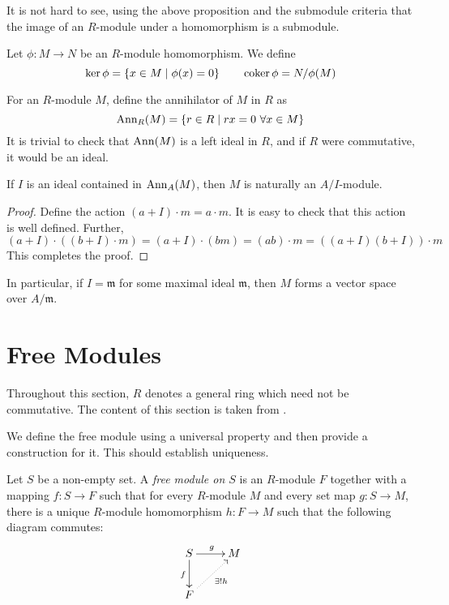 It is not hard to see, using the above proposition and the submodule criteria that the image of an $R$-module under a homomorphism is a submodule.


\begin{definition}
    Let $\phi:M\to N$ be an $R$-module homomorphism. We define 
    \begin{equation*}
        \ker\phi = \{x\in M\mid\phi(x) = 0\}\qquad\operatorname{coker}\phi = N/\phi(M)
    \end{equation*}
\end{definition}

For an $R$-module $M$, define the annihilator of $M$ in $R$ as 
\begin{equation*}
    \operatorname{Ann}_R(M) = \{r\in R\mid rx = 0~\forall x\in M\}
\end{equation*}
It is trivial to check that $\operatorname{Ann}(M)$ is a left ideal in $R$, and if $R$ were commutative, it would be an ideal.

\begin{proposition}
    If $I$ is an ideal contained in $\operatorname{Ann}_A(M)$, then $M$ is naturally an $A/I$-module.
\end{proposition}
\begin{proof}
    Define the action $(a + I)\cdot m = a\cdot m$. It is easy to check that this action is well defined. Further, 
    \begin{equation*}
        (a + I)\cdot((b + I)\cdot m) = (a + I)\cdot(bm) = (ab)\cdot m = ((a + I)(b + I))\cdot m
    \end{equation*}
    This completes the proof.
\end{proof}

In particular, if $I = \mathfrak m$ for some maximal ideal $\mathfrak m$, then $M$ forms a vector space over $A/\mathfrak m$.

\section{Free Modules}
Throughout this section, $R$ denotes a general ring which need not be commutative. The content of this section is taken from \cite{blyth}. 

We define the free module using a universal property and then provide a construction for it. This should establish uniqueness.

\begin{definition}
    Let $S$ be a non-empty set. A \textit{free module on $S$} is an $R$-module $F$ together with a mapping $f: S\to F$ such that for every $R$-module $M$ and every set map $g: S\to M$, there is a unique $R$-module homomorphism $h: F\to M$ such that the following diagram commutes: 
    \begin{equation*}
    \xymatrix{
        S\ar[r]^g\ar[d]_f & M\\
        F\ar@{.>}[ru]_{\exists! h}
    }
    \end{equation*}
\end{definition}

